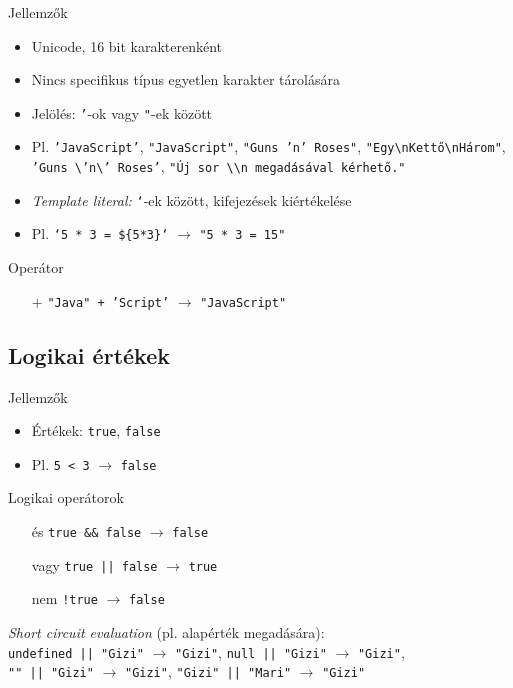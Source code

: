 \documentclass[usenames,dvipsnames,aspectratio=169]{beamer}
\begin{document}
\begin{frame}
    Jellemzők
    \begin{itemize}
        \item Unicode, 16 bit karakterenként
        \item Nincs specifikus típus egyetlen karakter tárolására
        \item Jelölés: \texttt{'}-ok vagy \texttt{"}-ek között
        \item Pl. \texttt{'JavaScript'}, \texttt{"JavaScript"}, \texttt{"Guns 'n' Roses"}, \texttt{"Egy\textbackslash nKettő\textbackslash nHárom"}, \texttt{'Guns \textbackslash 'n\textbackslash' Roses'}, \texttt{"Új sor \textbackslash\textbackslash n megadásával kérhető."}
        \item \emph{Template literal:} \texttt{`}-ek között, kifejezések kiértékelése
        \item Pl. \texttt{`5 * 3 = \$\{5*3\}`} $\to$ \texttt{"5 * 3 = 15"}
    \end{itemize}
    \vfill
    Operátor
    \begin{itemize}
        \item[$+$] \texttt{"Java" + 'Script'} $\to$ \texttt{"JavaScript"}
    \end{itemize}
\end{frame}

\subsection{Logikai értékek}

\begin{frame}
    Jellemzők
    \begin{itemize}
        \item Értékek: \texttt{true}, \texttt{false}
        \item Pl. \texttt{5 < 3} $\to$ \texttt{false}
    \end{itemize}
    \vfill
    Logikai operátorok
    \begin{itemize}
        \item[és] \texttt{true \&\& false} $\to$ \texttt{false}
        \item[vagy] \texttt{true || false} $\to$ \texttt{true}
        \item[nem] \texttt{!true} $\to$ \texttt{false}
    \end{itemize}
    \vfill
    \emph{Short circuit evaluation} (pl. alapérték megadására):\\ \qquad \texttt{undefined || "Gizi"} $\to$ \texttt{"Gizi"}, \texttt{null || "Gizi"} $\to$ \texttt{"Gizi"}, \\ \qquad \texttt{"" || "Gizi"} $\to$ \texttt{"Gizi"}, \texttt{"Gizi" || "Mari"} $\to$ \texttt{"Gizi"}
\end{frame}
\end{document}
